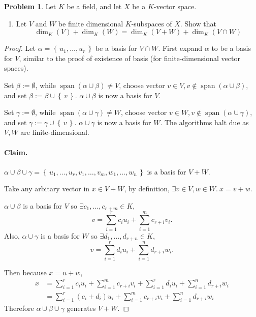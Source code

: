 \documentclass[11pt]{article}
\theoremstyle{definition}
\newtheorem{problem}{Problem}
\numberwithin{lemma}{problem}
\numberwithin{equation}{problem}
\newcommand{\set}[1]{\left\{\,#1\,\right\}}
\DeclareMathOperator{\spn}{span}
\begin{document}
\newpage
\begin{problem}
    Let $K$ be a field, and let $X$ be a $K$-vector space.
    \begin{enumerate}[label=(\alph*)]
        \item Let $V$ and $W$ be finite dimensional $K$-subspaces of $X$. Show that
            $$\dim_K(V) + \dim_K(W) = \dim_K(V + W) + \dim_K(V \cap W)$$
    \end{enumerate}
\end{problem}
\begin{proof}
    Let $\alpha = \set{u_1, \dots, u_r}$ be a basis for $V \cap W$.
    First expand $\alpha$ to be a basis for $V$, similar to the proof of existence of basis (for finite-dimensional vector spaces).

    Set $\beta := \emptyset$,
    while $\spn(\alpha\cup\beta) \ne V$,
    choose vector $v\in V, v\notin \spn(\alpha\cup\beta)$,
    and set $\beta := \beta \cup \set{v}$.
    $\alpha\cup\beta$ is now a basis for $V$.

    Set $\gamma := \emptyset$,
    while $\spn(\alpha\cup\gamma) \ne W$,
    choose vector $v\in W, v\notin \spn(\alpha\cup\gamma)$,
    and set $\gamma := \gamma \cup \set{v}$.
    $\alpha\cup\gamma$ is now a basis for $W$. The algorithms halt due as $V,W$ are finite-dimensional.
    \paragraph{Claim.} $\alpha\cup\beta\cup\gamma = \set{u_1, \dots, u_r, v_1,\dots, v_m, w_1, \dots, w_n}$ is a basis for $V + W$.

    Take any arbitary vector in $x\in V+W$, by definition, $\exists v\in V, w\in W.~ x = v + w$.

    $\alpha\cup\beta$ is a basis for $V$ so $\exists c_1, \dots, c_{r+m}\in K$,
    \[
        v = \sum_{i=1}^r c_iu_i + \sum_{i=1}^m c_{r+i} v_i.
    \]
    Also, $\alpha\cup\gamma$ is a basis for $W$ so $\exists d_1, \dots, d_{r+n}\in K$,
    \[
        v = \sum_{i=1}^r d_iu_i + \sum_{i=1}^n d_{r+i} w_i.
    \]

    Then because $x = u + w$,
    \begin{align*}
        x &= \sum_{i=1}^r c_iu_i + \sum_{i=1}^m c_{r+i} v_i + \sum_{i=1}^r d_iu_i + \sum_{i=1}^n d_{r+i} w_i    \\
        &= \sum_{i=1}^r (c_i+d_i)u_i + \sum_{i=1}^m c_{r+i} v_i + \sum_{i=1}^n d_{r+i} w_i
    \end{align*}
    Therefore $\alpha\cup\beta\cup\gamma$ generates $V+W$.


\end{proof}
\end{document}
